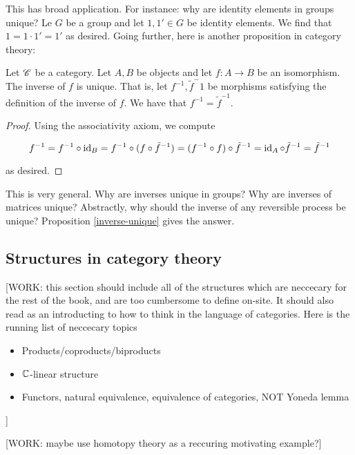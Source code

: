 This has broad application. For instance: why are identity elements in groups unique? Le $G$ be a group and let $1,1'\in G$ be identity elements. We find that $1=1\cdot 1' = 1'$ as desired. Going further, here is another proposition in category theory:

\begin{proposition}
\label{inverse-unique}
Let $\mathscr{C}$ be a category. Let $A,B$ be objects and let $f:A\to B$ be an isomorphism. The inverse of $f$ is unique. That is, let $f^{-1},\tilde{f}^-1$ be morphisms satisfying the definition of the inverse of $f$. We have that $f^{-1}=\tilde{f}^{-1}$.
\end{proposition}
\begin{proof} Using the associativity axiom, we compute

$$f^{-1}=f^{-1}\circ \operatorname{id} _{B} = f^{-1}\circ (f \circ \tilde{f}^{-1})=(f^{-1}\circ f)\circ \tilde{f}^{-1}=\operatorname{id}_A \circ \tilde{f}^{-1}=\tilde{f}^{-1}$$

as desired.
\end{proof}

This is very general. Why are inverses unique in groups? Why are inverses of matrices unique? Abstractly, why should the inverse of any reversible process be unique? Proposition \ref{inverse-unique} gives the answer.

\subsection{Structures in category theory}

[WORK: this section should include all of the structures which are neccecary for the rest of the book,
and are too cumbersome to define on-site. It should also read as an introducting to how to think in the language of categories. Here is the running list of neccecary topics

\begin{itemize}
\item Products/coproducts/biproducts
\item $\mathbb{C}$-linear structure
\item Functors, natural equivalence, equivalence of categories, NOT Yoneda lemma
\end{itemize}
]

[WORK: maybe use homotopy theory as a reccuring motivating example?]

